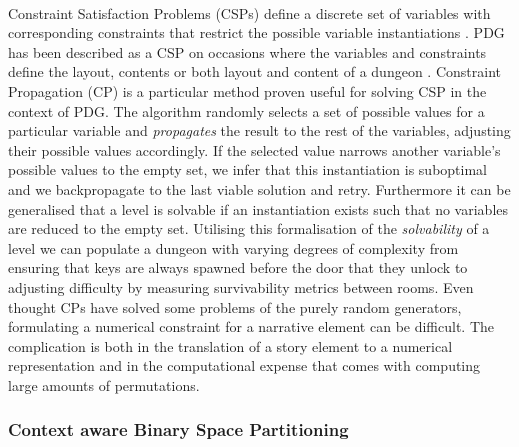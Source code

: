 \documentclass{UoYCSproject}
\begin{document}
\paragraph{}
Constraint Satisfaction Problems (CSPs) define a discrete set of variables with corresponding constraints that restrict the possible variable instantiations \parencite{kumar1992CPalgorithms}. PDG has been described as a CSP on occasions where the variables and constraints define the layout, contents or both layout and content of a dungeon \parencite{HorswillCSPMission, GreenCSPboth}. Constraint Propagation (CP) is a particular method proven useful for solving CSP in the context of PDG. The algorithm randomly selects a set of possible values for a particular variable and \textit{propagates} the result to the rest of the variables, adjusting their possible values accordingly. If the selected value narrows another variable's possible values to the empty set, we infer that this instantiation is suboptimal and we backpropagate to the last viable solution and retry. Furthermore it can be generalised that a level is solvable if an instantiation exists such that no variables are reduced to the empty set. Utilising this formalisation of the \textit{solvability} of a level we can populate a dungeon with varying degrees of complexity from ensuring that keys are always spawned before the door that they unlock to adjusting difficulty by measuring survivability metrics between rooms. Even thought CPs have solved some problems of the purely random generators, formulating a numerical constraint for a narrative element can be difficult. The complication is both in the translation of a story element to a numerical representation and in the computational expense that comes with computing large amounts of permutations.

\subsubsection{Context aware Binary Space Partitioning}
\label{subsub:BSP}
\end{document}
